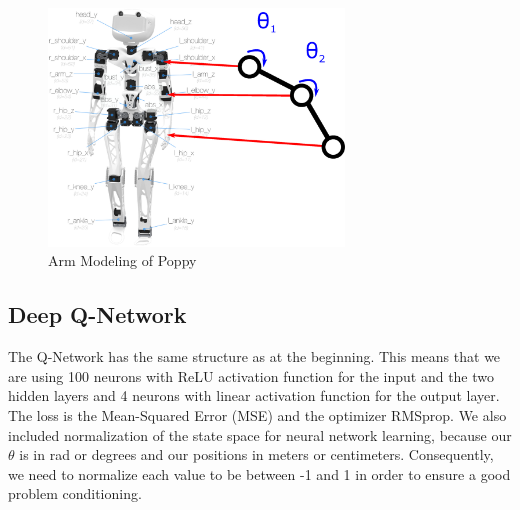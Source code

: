 \documentclass{article}
\begin{document}
\begin{figure}
	\centering
	\includegraphics[width=0.7\textwidth]{reportpics/poppy_2dof.eps}
	\caption{Arm Modeling of Poppy}
	\label{fig:poppy_2dof}
\end{figure}

\subsection{Deep Q-Network}
The Q-Network has the same structure as at the beginning. This means that we are using 100 neurons with ReLU activation function for the input and the two hidden layers and 4 neurons with linear activation function for the output layer. The loss is the Mean-Squared Error (MSE) and the optimizer RMSprop. We also included normalization of the state space for neural network learning, because our $\theta$ is in rad or degrees and our positions in meters or centimeters. Consequently, we need to normalize each value to be between -1 and 1 in order to ensure a good problem conditioning.

\vspace{\baselineskip}
\end{document}
